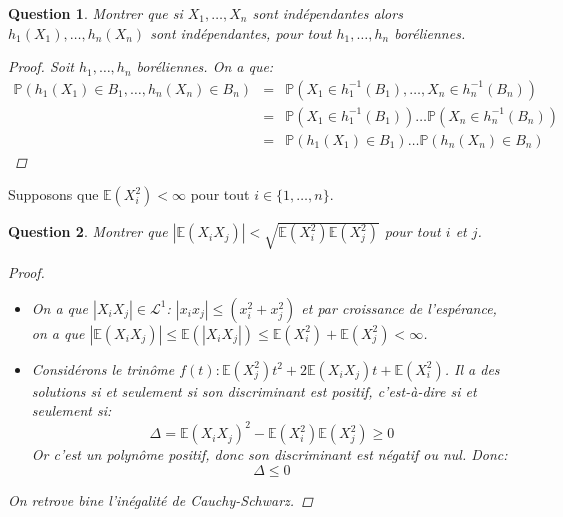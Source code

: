 \documentclass{article}
\theoremstyle{plain}
\newtheorem{question}{Question}
\theoremstyle{definition}
\begin{document}
\begin{question}
	Montrer que si $X_1, \dots, X_n$ sont indépendantes alors $h_1 (X_1), \dots, h_n (X_n)$ sont indépendantes, pour tout $h_1, \dots, h_n$ boréliennes.

	\begin{proof}
		Soit $h_1, \dots, h_n$ boréliennes. On a que:
		\begin{eqnarray*}
			\mathbb{P} (h_1 (X_1) \in B_1, \dots, h_n (X_n) \in B_n) &=& \mathbb{P} (X_1 \in h_1^{-1} (B_1), \dots, X_n \in h_n^{-1} (B_n)) \\
			&=& \mathbb{P} (X_1 \in h_1^{-1} (B_1)) \dots \mathbb{P} (X_n \in h_n^{-1} (B_n)) \\
			&=& \mathbb{P} (h_1 (X_1) \in B_1) \dots \mathbb{P} (h_n (X_n) \in B_n)
		\end{eqnarray*}
	\end{proof}
\end{question}

Supposons que $\mathbb{E} (X_i^2) < \infty$ pour tout $i \in \{1, \dots, n\}$.

\begin{question}
	Montrer que $|\mathbb{E} (X_iX_j)| < \sqrt{\mathbb{E} (X_i^2) \mathbb{E} (X_j^2)}$ pour tout $i$ et $j$.
	\begin{proof}
		\begin{itemize}
			\item On a que $|X_iX_j| \in \mathscr{L}^1$: $|x_ix_j| \leq (x_i^2 + x_j^2)$ et par croissance de l'espérance,
			      on a que $|\mathbb{E} (X_iX_j)| \leq \mathbb{E} (|X_iX_j|) \leq \mathbb{E} (X_i^2) + \mathbb{E} (X_j^2) < \infty$.
			\item Considérons le trinôme $f(t): \mathbb{E}(X_j^2)t^2 + 2\mathbb{E}(X_iX_j)t + \mathbb{E}(X_i^2)$. Il a des solutions si et seulement si son discriminant est positif, c'est-à-dire si et seulement si:
			      \begin{equation*}
				      \Delta = \mathbb{E}(X_iX_j)^2 - \mathbb{E}(X_i^2)\mathbb{E}(X_j^2) \geq 0
			      \end{equation*}
			      Or c'est un polynôme positif, donc son discriminant est négatif ou nul. Donc:
			      \begin{equation*}
				      \Delta \leq 0
			      \end{equation*}
		\end{itemize}

		On retrove bine l'inégalité de Cauchy-Schwarz.
	\end{proof}
\end{question}
\end{document}
